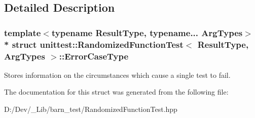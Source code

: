 \subsection{Detailed Description}
\subsubsection*{template$<$typename Result\+Type, typename... Arg\+Types$>$\\*
struct unittest\+::\+Randomized\+Function\+Test$<$ Result\+Type, Arg\+Types $>$\+::\+Error\+Case\+Type}

Stores information on the circumstances which cause a single test to fail. 

The documentation for this struct was generated from the following file\+:\begin{DoxyCompactItemize}
\item 
D\+:/\+Dev/\+\_\+\+Lib/barn\+\_\+test/Randomized\+Function\+Test.\+hpp\end{DoxyCompactItemize}
